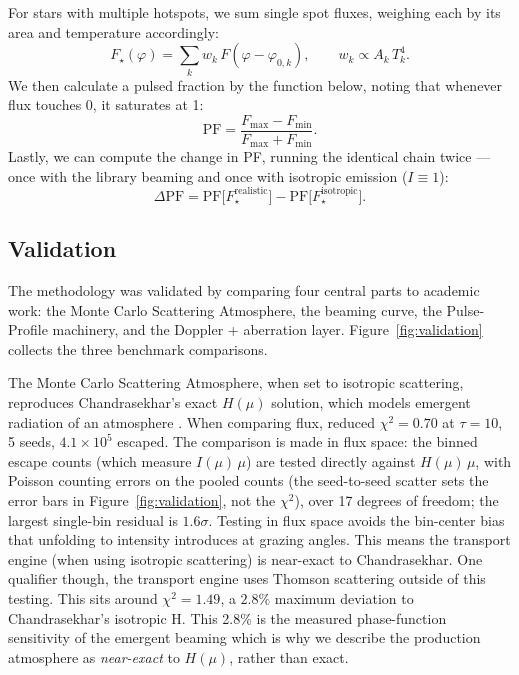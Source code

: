 \documentclass[twocolumn]{aastex701}
\begin{document}
For stars with multiple hotspots, we sum single spot fluxes, weighing each by its area and
temperature accordingly:
\begin{equation}
F_\star(\varphi) = \sum_k w_k\, F(\varphi - \varphi_{0,k}), \qquad w_k \propto A_k\, T_k^4.
    \label{eq:spotsum}
\end{equation}
We then calculate a pulsed fraction by the function below, noting that whenever flux touches
0, it saturates at 1:
\begin{equation}
    \mathrm{PF} = \frac{F_{\max} - F_{\min}}{F_{\max} + F_{\min}}. \label{eq:pf}
\end{equation}
Lastly, we can compute the change in PF, running the identical chain twice --- once with the
library beaming and once with isotropic emission ($I \equiv 1$):
\begin{equation}
\Delta \mathrm{PF} = \mathrm{PF}\big[F_\star^{\text{realistic}}\big] -
    \mathrm{PF}\big[F_\star^{\text{isotropic}}\big]. \label{eq:dpf}
\end{equation}


\subsection{Validation} \label{sec:methods-validation}
The methodology was validated by comparing four central parts to academic work: the Monte
Carlo Scattering Atmosphere, the beaming curve, the Pulse-Profile machinery, and the Doppler
+ aberration layer. Figure~\ref{fig:validation} collects the three benchmark comparisons.

The Monte Carlo Scattering Atmosphere, when set to isotropic scattering, reproduces
Chandrasekhar's exact $H(\mu)$ solution, which models emergent radiation of an atmosphere
\citep{Chandrasekhar1960}. When comparing flux, reduced $\chi^2 = 0.70$ at $\tau = 10$, 5
seeds, $4.1\times10^5$ escaped. The comparison is made in flux space: the binned escape
counts (which measure $I(\mu)\,\mu$) are tested directly against $H(\mu)\,\mu$,
with Poisson counting errors on the pooled counts (the seed-to-seed
scatter sets the error bars in Figure~\ref{fig:validation}, not the $\chi^2$), over 17
degrees of freedom; the largest single-bin residual is $1.6\sigma$. Testing in flux space avoids the bin-center bias that unfolding to
intensity introduces at grazing angles. This means the transport engine (when using
isotropic scattering) is near-exact to Chandrasekhar.
One qualifier though, the transport engine uses Thomson scattering outside of this testing.
This sits around $\chi^2 = 1.49$, a $2.8\%$ maximum deviation to Chandrasekhar's isotropic
H.
{This 2.8\% is the measured phase-function sensitivity of the emergent beaming which is why
we describe the production atmosphere as \emph{near-exact} to $H(\mu)$, rather than exact.}
\end{document}
